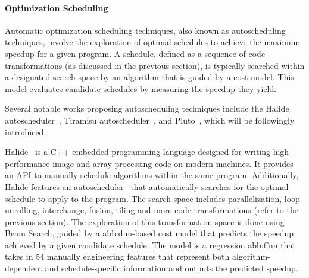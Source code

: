                 

            
            \paragraph{Optimization Scheduling}
                
                Automatic optimization scheduling techniques, also known as autoscheduling techniques, involve the exploration of optimal schedules to achieve the maximum speedup for a given program. A schedule, defined as a sequence of code transformations (as discussed in the previous section), is typically searched within a designated search space by an algorithm that is guided by a cost model. This model evaluates candidate schedules by measuring the speedup they yield.

                Several notable works proposing autoscheduling techniques include the Halide autoscheduler~\cite{halide}, Tiramisu autoscheduler~\cite{tiramisu-autosched}, and Pluto~\cite{pluto}, which will be followingly introduced.

                Halide~\cite{halide} is a C++ embedded programming language designed for writing high-performance image and array processing code on modern machines. It provides an API to manually schedule algorithms within the same program. Additionally, Halide features an autoscheduler~\cite{halide} that automatically searches for the optimal schedule to apply to the program. The search space includes parallelization, loop unrolling, interchange, fusion, tiling and more code transformations (refer to the previous section). The exploration of this transformation space is done using Beam Search, guided by a \gls{abb:dnn}-based cost model that predicts the speedup achieved by a given candidate schedule. The model is a regression \gls{abb:ffnn} that takes in 54 manually engineering features that represent both algorithm-dependent and schedule-specific information and outputs the predicted speedup.

